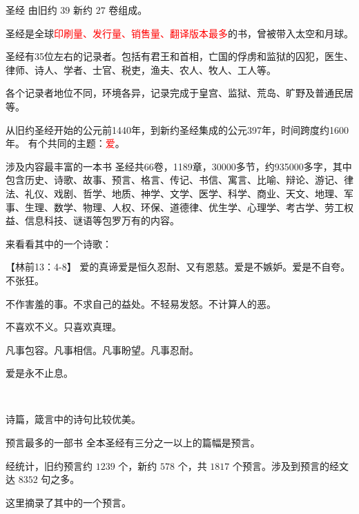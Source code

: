 \documentclass[UTF8]{ctexbeamer}
\begin{document}
	\begin{frame}{圣经}
		由旧约 $39$ 新约 $27$ 卷组成。\par\pause
		圣经是全球\textcolor{red}{印刷量、发行量、销售量、翻译版本最多}的书，曾被带入太空和月球。\par\pause
		圣经有35位左右的记录者。包括有君王和首相，亡国的俘虏和监狱的囚犯，医生、律师、诗人、学者、士官、税吏，渔夫、农人、牧人、工人等。\par\pause
		各个记录者地位不同，环境各异，记录完成于皇宫、监狱、荒岛、旷野及普通民居等。\par\pause
		从旧约圣经开始的公元前1440年，到新约圣经集成的公元397年，时间跨度约1600年。 有个共同的主题：\textcolor{red}{爱}。
	\end{frame}
	\begin{frame}{涉及内容最丰富的一本书}
		圣经共66卷，1189章，30000多节，约935000多字，其中包含历史、诗歌、故事、预言、格言、传记、书信、寓言、比喻、辩论、游记、律法、礼仪、戏剧、哲学、地质、神学、文学、医学、科学、商业、天文、地理、军事、生理、数学、物理、人权、环保、道德律、优生学、心理学、考古学、劳工权益、信息科技、谜语等包罗万有的内容。\par\pause
		来看看其中的一个诗歌：
	\end{frame}
	\begin{frame}{【林前13：4-8】}
		爱的真谛爱是恒久忍耐、又有恩慈。爱是不嫉妒。爱是不自夸。不张狂。\par
		不作害羞的事。不求自己的益处。不轻易发怒。不计算人的恶。\par
		不喜欢不义。只喜欢真理。\par 
		凡事包容。凡事相信。凡事盼望。凡事忍耐。\par 
		爱是永不止息。\par\pause
		~\par
		诗篇，箴言中的诗句比较优美。
	\end{frame}
	\begin{frame}{预言最多的一部书}
		全本圣经有三分之一以上的篇幅是预言。\par \pause
		经统计，旧约预言约 $1239$ 个，新约 $578$ 个，共 $1817$ 个预言。涉及到预言的经文达 $8352$ 句之多。\par \pause
		这里摘录了其中的一个预言。
	\end{frame}
\end{document}
